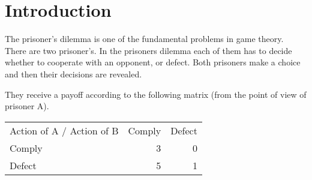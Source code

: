 \documentclass[a4paper,12pt]{article}
\begin{document}
\maketitle

\newcommand{\fittable}[1]{\begin{center}
\resizebox{\textwidth}{!}{#1}\end{center}
}

\newcommand{\img}[4]{
 \begin{figure}[!htp]
\centering
  \texttt{[image: \#2]}
  \caption{\emph{#3}}
  \label{#4}
 \end{figure}
}
\newcommand{\imgit}[4]{
\\[\intextsep]
\begin{minipage}{\linewidth}
  \centering%
  \texttt{[image: \#2]}%
  \figcaption{\emph{#3}}%
  \label{#4}%
\end{minipage}
\\[\intextsep]
}

\newcommand{\imgitX}[2]{
  {\centering
\fbox{
\begin{minipage}{#1\textwidth}
  \vskip .5em
  \centering
  \texttt{[image: \#2]}
  \vskip .5em
\end{minipage}
}
  }
}


\newpage

\tableofcontents

\section{Introduction}

The prisoner's dilemma is one of the fundamental problems in game theory.\\
There are two prisoner's. In the prisoners dilemma each of them has to decide whether to cooperate with an opponent, or defect. Both prisoners make a choice and then their decisions are revealed. 

They receive a payoff according to the following matrix (from the point of view of prisoner A). 

\begin{table*}[h]
	\centering
		\begin{tabular}{| l | r | r |}
		\hline
			Action of A / Action of B & Comply & Defect \\
			Comply                    & 3 & 0\\
			Defect                    & 5 & 1\\
			\hline
		\end{tabular}  
\end{table*}
\end{document}
